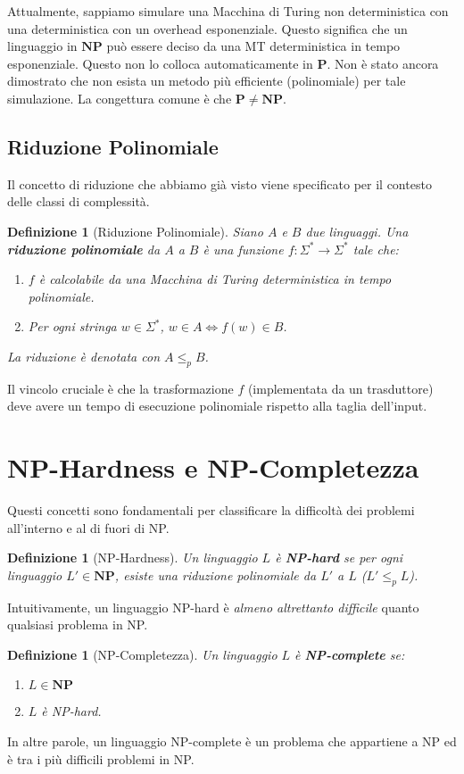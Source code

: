 \documentclass[a4paper, 11pt]{book} %
\newtheorem{definition}[theorem]{Definizione}
\theoremstyle{definition}
\begin{document}
Attualmente, sappiamo simulare una Macchina di Turing non deterministica con una deterministica con un overhead esponenziale. Questo significa che un linguaggio in $\mathbf{NP}$ può essere deciso da una MT deterministica in tempo esponenziale. Questo non lo colloca automaticamente in $\mathbf{P}$. Non è stato ancora dimostrato che non esista un metodo più efficiente (polinomiale) per tale simulazione. La congettura comune è che $\mathbf{P} \ne \mathbf{NP}$.

\subsection{Riduzione Polinomiale}

Il concetto di riduzione che abbiamo già visto viene specificato per il contesto delle classi di complessità.

\begin{definition}[Riduzione Polinomiale]
Siano $A$ e $B$ due linguaggi. Una \textbf{riduzione polinomiale} da $A$ a $B$ è una funzione $f: \Sigma^* \to \Sigma^*$ tale che:
\begin{enumerate}
    \item $f$ è calcolabile da una Macchina di Turing deterministica in tempo polinomiale.
    \item Per ogni stringa $w \in \Sigma^*$, $w \in A \iff f(w) \in B$.
\end{enumerate}
La riduzione è denotata con $A \le_p B$.
\end{definition}
Il vincolo cruciale è che la trasformazione $f$ (implementata da un trasduttore) deve avere un tempo di esecuzione polinomiale rispetto alla taglia dell'input.

\section{NP-Hardness e NP-Completezza}

Questi concetti sono fondamentali per classificare la difficoltà dei problemi all'interno e al di fuori di NP.

\begin{definition}[NP-Hardness]
Un linguaggio $L$ è \textbf{NP-hard} se per ogni linguaggio $L' \in \mathbf{NP}$, esiste una riduzione polinomiale da $L'$ a $L$ ($L' \le_p L$).
\end{definition}
Intuitivamente, un linguaggio NP-hard è \emph{almeno altrettanto difficile} quanto qualsiasi problema in NP.

\begin{definition}[NP-Completezza]
Un linguaggio $L$ è \textbf{NP-complete} se:
\begin{enumerate}
    \item $L \in \mathbf{NP}$
    \item $L$ è NP-hard.
\end{enumerate}
\end{definition}
In altre parole, un linguaggio NP-complete è un problema che appartiene a NP ed è tra i più difficili problemi in NP.
\end{document}
